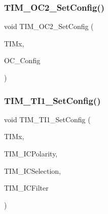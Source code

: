 \subsubsection{\texorpdfstring{T\+I\+M\+\_\+\+O\+C2\+\_\+\+Set\+Config()}{TIM\_OC2\_SetConfig()}}
{\footnotesize\ttfamily void T\+I\+M\+\_\+\+O\+C2\+\_\+\+Set\+Config (\begin{DoxyParamCaption}\item[{\hyperlink{struct_t_i_m___type_def}{T\+I\+M\+\_\+\+Type\+Def} $\ast$}]{T\+I\+Mx,  }\item[{\hyperlink{struct_t_i_m___o_c___init_type_def}{T\+I\+M\+\_\+\+O\+C\+\_\+\+Init\+Type\+Def} $\ast$}]{O\+C\+\_\+\+Config }\end{DoxyParamCaption})}

\mbox{\label{group___t_i_m___private___functions_ga83c847710a92f0558c862dd0dc889ff3}} 
\subsubsection{\texorpdfstring{T\+I\+M\+\_\+\+T\+I1\+\_\+\+Set\+Config()}{TIM\_TI1\_SetConfig()}}
{\footnotesize\ttfamily void T\+I\+M\+\_\+\+T\+I1\+\_\+\+Set\+Config (\begin{DoxyParamCaption}\item[{\hyperlink{struct_t_i_m___type_def}{T\+I\+M\+\_\+\+Type\+Def} $\ast$}]{T\+I\+Mx,  }\item[{uint32\+\_\+t}]{T\+I\+M\+\_\+\+I\+C\+Polarity,  }\item[{uint32\+\_\+t}]{T\+I\+M\+\_\+\+I\+C\+Selection,  }\item[{uint32\+\_\+t}]{T\+I\+M\+\_\+\+I\+C\+Filter }\end{DoxyParamCaption})}

